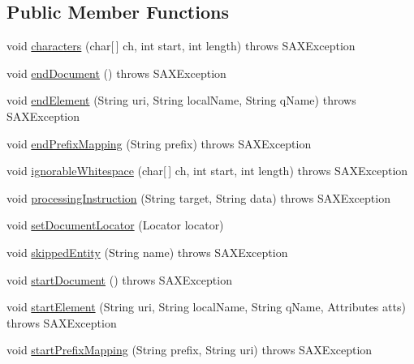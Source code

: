 \subsection*{Public Member Functions}
\begin{DoxyCompactItemize}
\item 
void \hyperlink{classrob_o_s2_1_1xml_1_1handler_1_1_default_handler_a9764697022e864dc51c936f934d62ebe}{characters} (char\mbox{[}$\,$\mbox{]} ch, int start, int length)  throws SAXException 
\item 
void \hyperlink{classrob_o_s2_1_1xml_1_1handler_1_1_default_handler_a2ec7a133c87914ae1807adf1c4f92433}{endDocument} ()  throws SAXException 
\item 
void \hyperlink{classrob_o_s2_1_1xml_1_1handler_1_1_default_handler_a42fdc64032f87172fa26ae3e248a60ae}{endElement} (String uri, String localName, String qName)  throws SAXException 
\item 
void \hyperlink{classrob_o_s2_1_1xml_1_1handler_1_1_default_handler_abbfec1faf8c8cd4ec64e6205d70961ec}{endPrefixMapping} (String prefix)  throws SAXException 
\item 
void \hyperlink{classrob_o_s2_1_1xml_1_1handler_1_1_default_handler_a28731e3e36140baf153877c41f896d2e}{ignorableWhitespace} (char\mbox{[}$\,$\mbox{]} ch, int start, int length)  throws SAXException 
\item 
void \hyperlink{classrob_o_s2_1_1xml_1_1handler_1_1_default_handler_a2bbe225c5233be6be380eb59e88efeaf}{processingInstruction} (String target, String data)  throws SAXException 
\item 
void \hyperlink{classrob_o_s2_1_1xml_1_1handler_1_1_default_handler_a5580ad3d42f43971059e7257f4b67d85}{setDocumentLocator} (Locator locator)
\item 
void \hyperlink{classrob_o_s2_1_1xml_1_1handler_1_1_default_handler_a374eb268241a4a40cf53f3ca05ae9273}{skippedEntity} (String name)  throws SAXException 
\item 
void \hyperlink{classrob_o_s2_1_1xml_1_1handler_1_1_default_handler_af26d2b1954e9f0295dd94203baad1e54}{startDocument} ()  throws SAXException 
\item 
void \hyperlink{classrob_o_s2_1_1xml_1_1handler_1_1_default_handler_aa646dc9c701327ed3622c033f0e32882}{startElement} (String uri, String localName, String qName, Attributes atts)  throws SAXException 
\item 
void \hyperlink{classrob_o_s2_1_1xml_1_1handler_1_1_default_handler_ad5084bf3fe1abf237537a01482f31974}{startPrefixMapping} (String prefix, String uri)  throws SAXException 
\end{DoxyCompactItemize}

